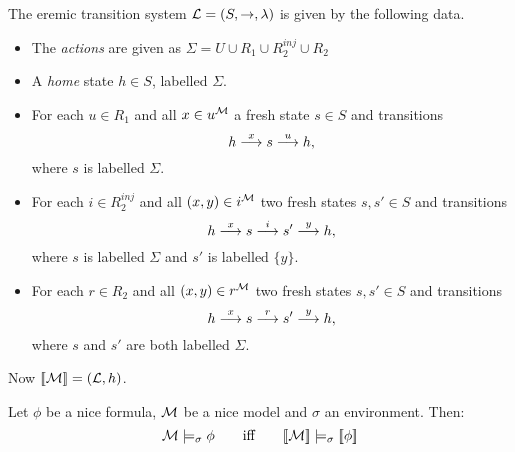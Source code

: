The eremic transition system $\mathcal{L} = (S, \rightarrow, \lambda)$ is given by
the following data.
\begin{itemize}

\item The \emph{actions} are given as $\Sigma = U \cup R_1 \cup
  R_2^{inj} \cup R_2$

\item A \emph{home} state $h \in S$, labelled $\Sigma$.

\item For each $u \in R_1$ and all $x \in u^{\mathcal{M}}$ a fresh state
  $s \in S$ and transitions
\[
   h \stackrel{x}{\longrightarrow} s \stackrel{u}{\longrightarrow} h,
\]
where $s$ is labelled $\Sigma$.

\item For each $i \in R_2^{inj}$ and all $(x, y)  \in
i^{\mathcal{M}}$ two fresh states $s, s' \in S$ and transitions
\[
   h \stackrel{x}{\longrightarrow} s \stackrel{i}{\longrightarrow} s' \stackrel{y}{\longrightarrow} h,
\]
where $s$ is labelled $\Sigma$ and $s'$ is labelled $\{y\}$.

\item For each $r \in R_2$ and all $(x, y)  \in                                                                         
r^{\mathcal{M}}$ two fresh states $s, s' \in S$ and transitions
\[
   h \stackrel{x}{\longrightarrow} s \stackrel{r}{\longrightarrow} s' \stackrel{y}{\longrightarrow} h,
\]
where $s$ and $s'$ are both labelled $\Sigma$.

\end{itemize}

\NI Now $\lbrack\!\lbrack \mathcal{M} \rbrack\!\rbrack = (\mathcal{L}, h)$.

\begin{theorem}[Conjecture]
Let $\phi$ be a nice formula, $\mathcal{M}$ be a nice model and $\sigma$
an environment. Then:
\[
   \mathcal{M} \models_{\sigma} \phi
      \qquad\text{iff}\qquad
   \lbrack\!\lbrack \mathcal{M} \rbrack\!\rbrack \models_{\sigma} \lbrack\!\lbrack \phi \rbrack\!\rbrack
\]
\end{theorem}

